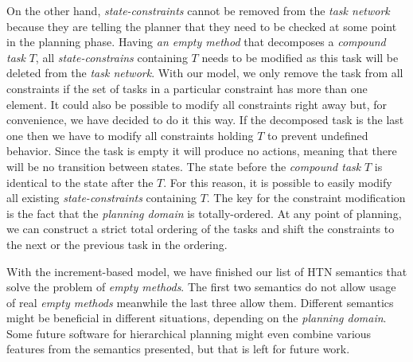\noindent
On the other hand, \emph{state-constraints} cannot be removed from the \emph{task network} because they are telling the planner that they need to be checked at some point in the planning phase. Having \emph{an empty method} that decomposes a \emph{compound task} $T$, all \emph{state-constrains} containing $T$ needs to be modified as this task will be deleted from the \emph{task network}. With our model, we only remove the task from all constraints if the set of tasks in a particular constraint has more than one element. It could also be possible to modify all constraints right away but, for convenience, we have decided to do it this way. If the decomposed task is the last one then we have to modify all constraints holding $T$ to prevent undefined behavior. Since the task is empty it will produce no actions, meaning that there will be no transition between states. The state before the \emph{compound task} $T$ is identical to the state after the $T$. For this reason, it is possible to easily modify all existing \emph{state-constraints} containing $T$. The key for the constraint modification is the fact that the \emph{planning domain} is totally-ordered. At any point of planning, we can construct a strict total ordering of the tasks and shift the constraints to the next or the previous task in the ordering.

\medskip\noindent
With the increment-based model, we have finished our list of HTN semantics that solve the problem of \emph{empty methods}. The first two semantics do not allow usage of real \emph{empty methods} meanwhile the last three allow them. Different semantics might be beneficial in different situations, depending on the \emph{planning domain}. Some future software for hierarchical planning might even combine various features from the semantics presented, but that is left for future work.
